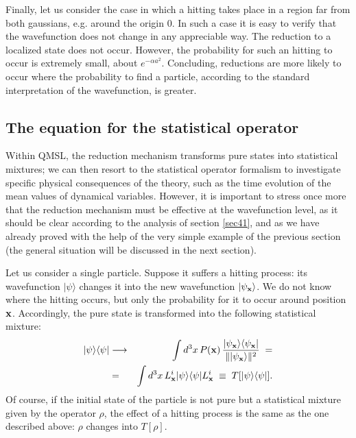 \documentclass[10pt,a4paper]{article}
\begin{document}
Finally, let us consider the case in which a hitting takes place
in a region far from both gaussians, e.g. around the origin $0$.
In such a case it is easy to verify that the wavefunction does not
change in any appreciable way. The reduction to a localized state
does not occur. However, the probability for such an hitting to
occur is extremely small, about $e^{-\alpha a^{2}}$. Concluding,
reductions are more likely to occur where the probability to find
a particle, according to the standard interpretation of the
wavefunction, is greater.


\subsection{The equation for the statistical operator}
\label{sec52}

Within QMSL, the reduction mechanism transforms pure states into
statistical mixtures; we can then resort to the statistical
operator formalism to investigate specific physical consequences
of the theory, such as the time evolution of the mean values of
dynamical variables. However, it is important to stress once more that the
reduction mechanism must be effective at the wavefunction level,
as it should be clear according to the analysis of section
\ref{sec41}, and as we have already proved with the help of the
very simple example of the previous section (the general situation
will be discussed in the next section).

Let us consider a single particle. Suppose it suffers a hitting
process: its wavefunction $|\psi\rangle$ changes it into the new
wavefunction $|\psi_{\bf x}\rangle$. We do not know where the
hitting occurs, but only the probability for it to occur around
position ${\bf x}$. Accordingly, the pure state is transformed
into the following statistical mixture:
\begin{eqnarray}
|\psi\rangle\langle\psi| & \longrightarrow & \int d^{3} x\, P({\bf
x})\, \frac{|\psi_{\bf x}\rangle\langle\psi_{\bf x}|}{\|
|\psi_{\bf x}\rangle \|^{2}} \; = \nonumber \\ & = & \int d^{3}
x\, L^{i}_{\bf x} |\psi\rangle\langle\psi| L^{i}_{\bf x} \; \equiv
\; T[|\psi\rangle\langle\psi|].
\end{eqnarray}
Of course, if the initial state of the particle is not pure but a
statistical mixture given by the operator $\rho$, the effect of a
hitting process is the same as the one described above: $\rho$
changes into $T[\rho]$.
\end{document}

